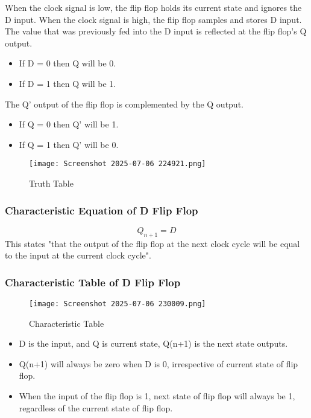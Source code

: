 \documentclass[12pt]{article}
\begin{document}
    When the clock signal is low, the flip flop holds its current state and ignores the D input.
    When the clock signal is high, the flip flop samples and stores D input.
    The value that was previously fed into the D input is reflected at the flip flop's Q output.
    \begin{itemize}
        \item If D = 0 then Q will be 0.
        \item If D = 1 then Q will be 1.
    \end{itemize}
    The Q' output of the flip flop is complemented by the Q output. 
    \begin{itemize}
        \item  If Q = 0 then Q' will be 1.
        \item If Q = 1 then Q' will be 0.
    \end{itemize}
    
\begin{figure}[H]
    \centering
    \texttt{[image: Screenshot 2025-07-06 224921.png]}
    \caption{Truth Table}
    \label{fig:enter-label}
\end{figure}

   
    \subsubsection{Characteristic Equation of D Flip Flop}
        \[
        Q_{n+1} = D
        \]
        This states "that the output of the flip flop at the next clock cycle will be equal to the input at the current clock cycle".

    \subsubsection{Characteristic Table of D Flip Flop}
    \begin{figure}[H]
        \centering
        \texttt{[image: Screenshot 2025-07-06 230009.png]}
        \caption{Characteristic Table}
        \label{fig:enter-label}
    \end{figure}
    \begin{itemize}
        \item D is the input, and Q is current state, Q(n+1) is the next state outputs.
        \item Q(n+1) will always be zero when D is 0, irrespective of current state of flip flop.
        \item When the input of the flip flop is 1,  next state of  flip flop will always be 1, regardless of the current state of flip flop.
    \end{itemize}
\end{document}
